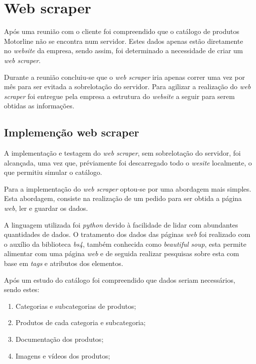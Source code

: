 

\section{Web scraper}

Após uma reunião com o cliente foi compreendido que o catálogo de produtos Motorline não se encontra num servidor. Estes dados apenas estão diretamente no \textit{website} da empresa, sendo assim, foi determinado a necessidade de criar um \textit{web scraper}.

Durante a reunião concluiu-se que o \textit{web scraper} iria apenas correr uma vez por mês para ser evitada a sobrelotação do servidor. Para agilizar a realização do \textit{web scraper} foi entregue pela empresa a estrutura do \textit{website} a seguir para serem obtidas as informações.

\newpage

\subsection{Implemenção web scraper}
A implementação e testagem do \textit{web scraper}, sem sobrelotação do servidor, foi alcançada, uma vez que, préviamente foi descarregado todo o \textit{wesite} localmente, o que permitiu simular o catálogo.

Para a implementação do \textit{web scraper} optou-se por uma abordagem mais simples. Esta abordagem, consiste na realização de um pedido para ser obtida a página \textit{web}, ler e guardar os dados.

A linguagem utilizada foi \textit{python} devido à facilidade de lidar com abundantes quantidades de dados. O tratamento dos dados das páginas \textit{web} foi realizado com o auxílio da biblioteca \textit{bs4}, também conhecida como \textit{beautiful soup}, esta permite alimentar com uma página \textit{web} e de seguida realizar pesquisas sobre esta com base em \textit{tags} e atributos dos elementos.

Após um estudo do catálogo foi compreendido que dados seriam necessários, sendo estes:
\begin{enumerate}
    \item Categorias e subcategorias de produtos;
    \item Produtos de cada categoria e subcategoria;
    \item Documentação dos produtos;
    \item Imagens e vídeos dos produtos;
\end{enumerate}

